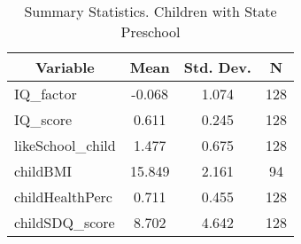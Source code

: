
\begin{table}[htbp]\centering \caption{Summary Statistics. Children with State Preschool \label{schoolChildmaternaStat}}
\begin{tabular}{l c c  c}\hline\hline
\multicolumn{1}{c}{\textbf{Variable}} & \textbf{Mean}
 & \textbf{Std. Dev.} & \textbf{N}\\ \hline
IQ\_factor & -0.068 & 1.074  & 128\\
IQ\_score & 0.611 & 0.245  & 128\\
likeSchool\_child & 1.477 & 0.675  & 128\\
childBMI & 15.849 & 2.161  & 94\\
childHealthPerc & 0.711 & 0.455  & 128\\
childSDQ\_score & 8.702 & 4.642  & 128\\
\hline\end{tabular}
\end{table}
